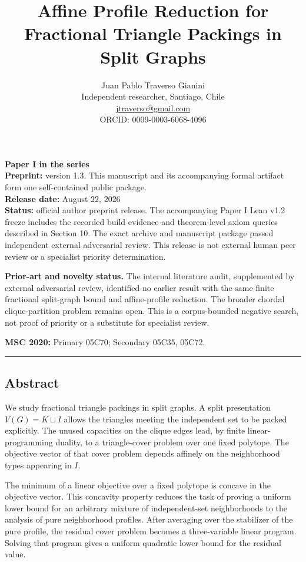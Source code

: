 \documentclass[
  american,
  11pt,
  a4paper,
]{article}
\title{Affine Profile Reduction for Fractional Triangle Packings in Split Graphs}
\author{Juan Pablo Traverso Gianini\\
\small Independent researcher, Santiago, Chile\\
\small \href{mailto:jtraverso@gmail.com}{jtraverso@gmail.com}\\
\small ORCID: 0009-0003-6068-4096}
\date{}
\begin{document}
\sloppy
\raggedbottom
\maketitle

\textbf{Paper I in the series}\\
\textbf{Preprint:} version 1.3. This manuscript and its accompanying formal artifact form one self-contained public package.\\
\textbf{Release date:} August 22, 2026\\
\textbf{Status:} official author preprint release. The accompanying Paper I Lean v1.2 freeze includes the recorded build evidence and theorem-level axiom queries described in Section 10. The exact archive and manuscript package passed independent external adversarial review. This release is not external human peer review or a specialist priority determination.

\textbf{Prior-art and novelty status.} The internal literature audit, supplemented by external adversarial review, identified no earlier result with the same finite fractional split-graph bound and affine-profile reduction. The broader chordal clique-partition problem remains open. This is a corpus-bounded negative search, not proof of priority or a substitute for specialist review.

\textbf{MSC 2020:} Primary 05C70; Secondary 05C35, 05C72.

\begin{center}\rule{0.5\linewidth}{0.5pt}\end{center}

\subsection{Abstract}\label{abstract}

We study fractional triangle packings in split graphs. A split presentation \(V(G)=K\sqcup I\) allows the triangles meeting the independent set to be packed explicitly. The unused capacities on the clique edges lead, by finite linear-programming duality, to a triangle-cover problem over one fixed polytope. The objective vector of that cover problem depends affinely on the neighborhood types appearing in \(I\).

The minimum of a linear objective over a fixed polytope is concave in the objective vector. This concavity property reduces the task of proving a uniform lower bound for an arbitrary mixture of independent-set neighborhoods to the analysis of pure neighborhood profiles. After averaging over the stabilizer of the pure profile, the residual cover problem becomes a three-variable linear program. Solving that program gives a uniform quadratic lower bound for the residual value.
\end{document}

